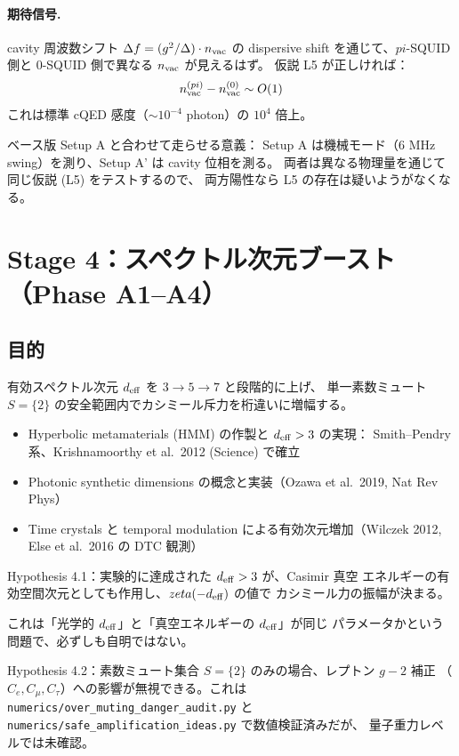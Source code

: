\documentclass[11pt,a4paper]{article}
\def\pi{pi}%
\def\zeta{zeta}%
\def\textbf#1{#1}%
\begin{document}
\paragraph{期待信号.}
cavity 周波数シフト $\Delta f = (g^2/\Delta)\cdot n_{\rm vac}$ の dispersive
shift を通じて、$\pi$-SQUID 側と 0-SQUID 側で異なる $n_{\rm vac}$ が見えるはず。
仮説 L5 が正しければ：
\[
  n_{\rm vac}^{(\pi)} - n_{\rm vac}^{(0)} \sim O(1)
\]
これは標準 cQED 感度（$\sim 10^{-4}$ photon）の $10^4$ 倍上。

\textbf{ベース版 Setup A と合わせて走らせる意義}：
Setup A は機械モード（6 MHz swing）を測り、Setup A' は cavity 位相を測る。
両者は異なる物理量を通じて同じ仮説 (L5) をテストするので、
\textbf{両方陽性なら L5 の存在は疑いようがなくなる}。

\newpage

\section{Stage 4：スペクトル次元ブースト（Phase A1--A4）}

\subsection{目的}

有効スペクトル次元 $d_{\rm eff}$ を $3 \to 5 \to 7$ と段階的に上げ、
\textbf{単一素数ミュート $S=\{2\}$ の安全範囲内で}カシミール斥力を桁違いに増幅する。

\begin{confirmedbox}
\begin{itemize}
\item Hyperbolic metamaterials (HMM) の作製と $d_{\rm eff} > 3$ の実現：
  Smith--Pendry 系、Krishnamoorthy et al.\ 2012 (Science) で確立
\item Photonic synthetic dimensions の概念と実装（Ozawa et al.\ 2019, Nat Rev Phys）
\item Time crystals と temporal modulation による有効次元増加（Wilczek 2012,
  Else et al.\ 2016 の DTC 観測）
\end{itemize}
\end{confirmedbox}

\begin{hypothesisbox}
\textbf{Hypothesis 4.1}：実験的に達成された $d_{\rm eff} > 3$ が、Casimir 真空
エネルギーの有効空間次元としても作用し、$\zeta(-d_{\rm eff})$ の値で
カシミール力の振幅が決まる。

これは「光学的 $d_{\rm eff}$」と「真空エネルギーの $d_{\rm eff}$」が同じ
パラメータかという問題で、必ずしも自明ではない。

\textbf{Hypothesis 4.2}：素数ミュート集合 $S=\{2\}$ のみの場合、レプトン $g-2$ 補正
（$C_e, C_\mu, C_\tau$）への影響が無視できる。これは
\texttt{numerics/over\_muting\_danger\_audit.py} と
\texttt{numerics/safe\_amplification\_ideas.py} で数値検証済みだが、
量子重力レベルでは未確認。
\end{hypothesisbox}
\end{document}
